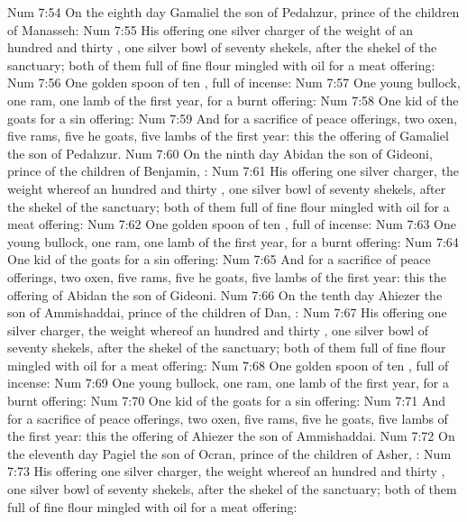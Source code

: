 \vs Num 7:54 On the eighth day  Gamaliel the son of Pedahzur, prince of the children of Manasseh:
\vs Num 7:55 His offering  one silver charger of the weight of an hundred and thirty , one silver bowl of seventy shekels, after the shekel of the sanctuary; both of them full of fine flour mingled with oil for a meat offering:
\vs Num 7:56 One golden spoon of ten , full of incense:
\vs Num 7:57 One young bullock, one ram, one lamb of the first year, for a burnt offering:
\vs Num 7:58 One kid of the goats for a sin offering:
\vs Num 7:59 And for a sacrifice of peace offerings, two oxen, five rams, five he goats, five lambs of the first year: this  the offering of Gamaliel the son of Pedahzur.
\vs Num 7:60 On the ninth day Abidan the son of Gideoni, prince of the children of Benjamin, :
\vs Num 7:61 His offering  one silver charger, the weight whereof  an hundred and thirty , one silver bowl of seventy shekels, after the shekel of the sanctuary; both of them full of fine flour mingled with oil for a meat offering:
\vs Num 7:62 One golden spoon of ten , full of incense:
\vs Num 7:63 One young bullock, one ram, one lamb of the first year, for a burnt offering:
\vs Num 7:64 One kid of the goats for a sin offering:
\vs Num 7:65 And for a sacrifice of peace offerings, two oxen, five rams, five he goats, five lambs of the first year: this  the offering of Abidan the son of Gideoni.
\vs Num 7:66 On the tenth day Ahiezer the son of Ammishaddai, prince of the children of Dan, :
\vs Num 7:67 His offering  one silver charger, the weight whereof  an hundred and thirty , one silver bowl of seventy shekels, after the shekel of the sanctuary; both of them full of fine flour mingled with oil for a meat offering:
\vs Num 7:68 One golden spoon of ten , full of incense:
\vs Num 7:69 One young bullock, one ram, one lamb of the first year, for a burnt offering:
\vs Num 7:70 One kid of the goats for a sin offering:
\vs Num 7:71 And for a sacrifice of peace offerings, two oxen, five rams, five he goats, five lambs of the first year: this  the offering of Ahiezer the son of Ammishaddai.
\vs Num 7:72 On the eleventh day Pagiel the son of Ocran, prince of the children of Asher, :
\vs Num 7:73 His offering  one silver charger, the weight whereof  an hundred and thirty , one silver bowl of seventy shekels, after the shekel of the sanctuary; both of them full of fine flour mingled with oil for a meat offering:
